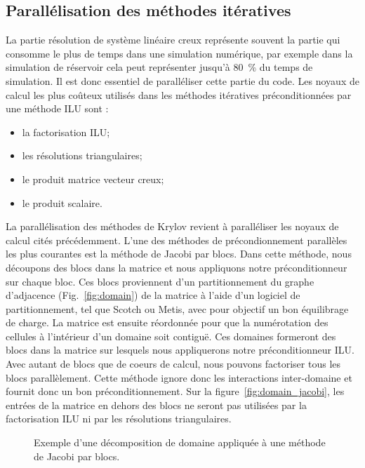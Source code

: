 \subsection{Parallélisation des méthodes itératives}
La partie résolution de système linéaire creux représente souvent la partie qui consomme le plus de temps dans une simulation numérique, par exemple dans la simulation de réservoir cela peut représenter jusqu'à 80~\% du temps de simulation.
%
Il est donc essentiel de paralléliser cette partie du code.
%
Les noyaux de calcul les plus coûteux utilisés dans les méthodes itératives préconditionnées par une méthode ILU sont :
\begin{itemize}
  \item la factorisation ILU;
  \item les résolutions triangulaires;
  \item le produit matrice vecteur creux;
  \item le produit scalaire.
\end{itemize}
La parallélisation des méthodes de Krylov revient à paralléliser les noyaux de calcul cités précédemment.
%
L'une des méthodes de précondionnement parallèles les plus courantes est la méthode de Jacobi par blocs.
%
Dans cette méthode, nous découpons des blocs dans la matrice et nous appliquons notre préconditionneur sur chaque bloc.
%
Ces blocs proviennent d'un partitionnement du graphe d'adjacence (Fig.~\ref{fig:domain}) de la matrice à l'aide d'un logiciel de partitionnement, tel que Scotch ou Metis, avec pour objectif un bon équilibrage de charge.
%
La matrice est ensuite réordonnée pour que la numérotation des cellules à l'intérieur d'un domaine soit contiguë.
%
Ces domaines formeront des blocs dans la matrice sur lesquels nous appliquerons notre préconditionneur ILU.
%
Avec autant de blocs que de coeurs de calcul, nous pouvons factoriser tous les blocs parallèlement.
%
Cette méthode ignore donc les interactions inter-domaine et fournit donc un bon préconditionnement.
%
Sur la figure~\ref{fig:domain_jacobi}, les entrées de la matrice en dehors des blocs ne seront pas utilisées par la factorisation ILU ni par les résolutions triangulaires.
\begin{figure}[!h]
     \begin{center}
    \end{center}
    \caption{Exemple d'une décomposition de domaine appliquée à une méthode de Jacobi par blocs.}
    \label{fig:jacobi}
\end{figure}
